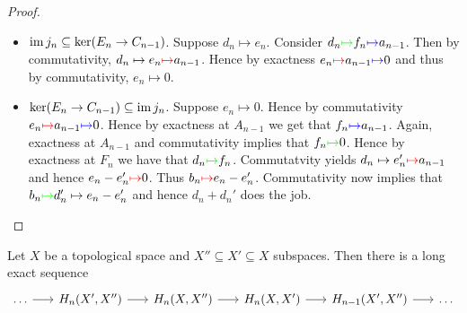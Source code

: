 \begin{proof}
\begin{enumerate}[label = \textit{Step \arabic*:}, wide = 0pt]
			\begin{itemize}[wide = 0pt]
				\item $\operatorname{im} j_n \subseteq \ker(E_n \to C_{n - 1})$. Suppose $d_n \mapsto e_n$. Consider $d_n \textcolor{green}{\mapsto}f_n \textcolor{blue}{\mapsto} a_{n-1}$. Then by commutativity, $d_n \mapsto e_n \textcolor{red}{\mapsto} a_{n - 1}$. Hence by exactness $e_n \textcolor{red}{\mapsto} a_{n - 1} \textcolor{blue}{\mapsto} 0$ and thus by commutativity, $e_n \mapsto 0$.
				\item $\ker(E_n \to C_{n - 1}) \subseteq \operatorname{im} j_n$. Suppose $e_n \mapsto 0$. Hence by commutativity $e_n \textcolor{red}{\mapsto} a_{n - 1} \textcolor{blue}{\mapsto} 0$. Hence by exactness at $A_{n - 1}$ we get that $f_n \textcolor{blue}{\mapsto} a_{n - 1}$. Again, exactness at $A_{n - 1}$ and commutativity implies that $f_n \textcolor{green}{\mapsto} 0$. Hence by exactness at $F_n$ we have that $d_n \textcolor{green}{\mapsto} f_n$. Commutatvity yields $d_n \mapsto e_n' \textcolor{red}{\mapsto} a_{n - 1}$ and hence $e_n - e_n' \textcolor{red}{\mapsto} 0$. Thus $b_n \textcolor{red}{\mapsto} e_n - e_n'$. Commutativity now implies that $b_n \textcolor{green}{\mapsto} d_n' \mapsto e_n - e_n'$ and hence $d_n + d_n'$ does the job. 
			\end{itemize}
	\end{enumerate}
\end{proof}

\begin{proposition}
	Let $X$ be a topological space and $X'' \subseteq X' \subseteq X$ subspaces. Then there is a long exact sequence
	\begin{equation*}
		\begin{tikzcd}[column sep=4ex]
			\dots \arrow[r] & H_n(X',X'') \arrow[r] & H_n(X,X'') \arrow[r] & H_n(X,X')\arrow[r] & H_{n - 1}(X',X'') \arrow[r] & \dots
		\end{tikzcd}
	\end{equation*}
\end{proposition}

